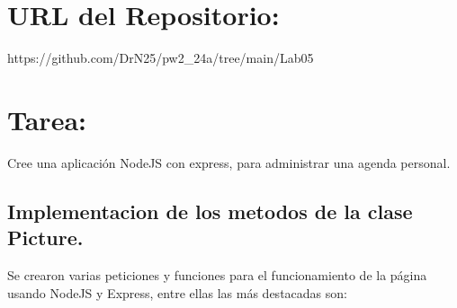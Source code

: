 \documentclass{article}
\begin{document}
\section{URL del Repositorio:}
https://github.com/DrN25/pw2\_24a/tree/main/Lab05
	
\section{Tarea:}
Cree una aplicación NodeJS con express, para administrar una agenda personal.
\subsection*{Implementacion de los metodos de la clase Picture.}
Se crearon varias peticiones y funciones para el funcionamiento de la página usando NodeJS y Express, entre ellas las más destacadas son:
\end{document}
